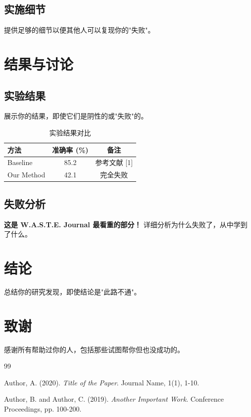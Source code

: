 \documentclass[a4paper,12pt]{article}
\begin{document}
\subsection{实施细节}

提供足够的细节以便其他人可以复现你的"失败"。

\section{结果与讨论}

\subsection{实验结果}

展示你的结果，即使它们是阴性的或"失败"的。

\begin{table}[h]
\centering
\caption{实验结果对比}
\label{tab:results}
\begin{tabular}{lcc}
\toprule
方法 & 准确率 (\%) & 备注 \\
\midrule
Baseline & 85.2 & 参考文献 [1] \\
Our Method & 42.1 & 完全失败 \\
\bottomrule
\end{tabular}
\end{table}

\subsection{失败分析}

\textbf{这是 W.A.S.T.E. Journal 最看重的部分！} 详细分析为什么失败了，从中学到了什么。

\section{结论}

总结你的研究发现，即使结论是"此路不通"。

\section*{致谢}

感谢所有帮助过你的人，包括那些试图帮你但也没成功的。

\begin{thebibliography}{99}

Author, A. (2020).
\textit{Title of the Paper}.
Journal Name, 1(1), 1-10.

Author, B. and Author, C. (2019).
\textit{Another Important Work}.
Conference Proceedings, pp. 100-200.

\end{thebibliography}
\end{document}
